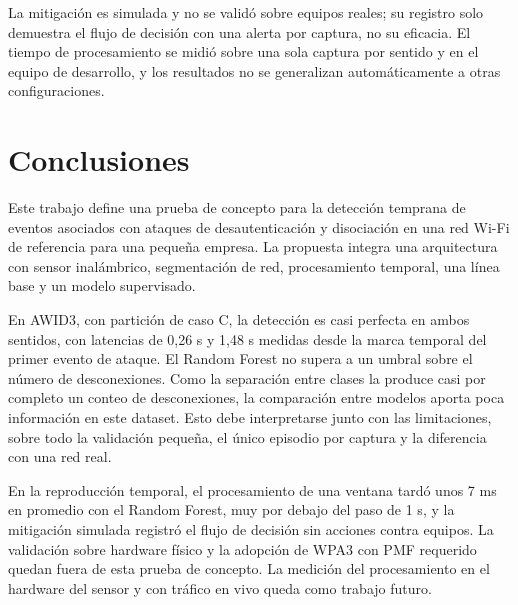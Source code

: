 \documentclass[journal]{IEEEtran}
\begin{document}
La mitigación es simulada y no se validó sobre equipos reales; su registro solo demuestra el flujo de decisión con una alerta por captura, no su eficacia. El tiempo de procesamiento se midió sobre una sola captura por sentido y en el equipo de desarrollo, y los resultados no se generalizan automáticamente a otras configuraciones.

\section{Conclusiones}

Este trabajo define una prueba de concepto para la detección temprana de eventos asociados con ataques de desautenticación y disociación en una red Wi-Fi de referencia para una pequeña empresa. La propuesta integra una arquitectura con sensor inalámbrico, segmentación de red, procesamiento temporal, una línea base y un modelo supervisado.

En AWID3, con partición de caso C, la detección es casi perfecta en ambos sentidos, con latencias de 0,26 s y 1,48 s medidas desde la marca temporal del primer evento de ataque. El Random Forest no supera a un umbral sobre el número de desconexiones. Como la separación entre clases la produce casi por completo un conteo de desconexiones, la comparación entre modelos aporta poca información en este dataset. Esto debe interpretarse junto con las limitaciones, sobre todo la validación pequeña, el único episodio por captura y la diferencia con una red real.

En la reproducción temporal, el procesamiento de una ventana tardó unos 7 ms en promedio con el Random Forest, muy por debajo del paso de 1 s, y la mitigación simulada registró el flujo de decisión sin acciones contra equipos. La validación sobre hardware físico y la adopción de WPA3 con PMF requerido quedan fuera de esta prueba de concepto. La medición del procesamiento en el hardware del sensor y con tráfico en vivo queda como trabajo futuro.
\end{document}
